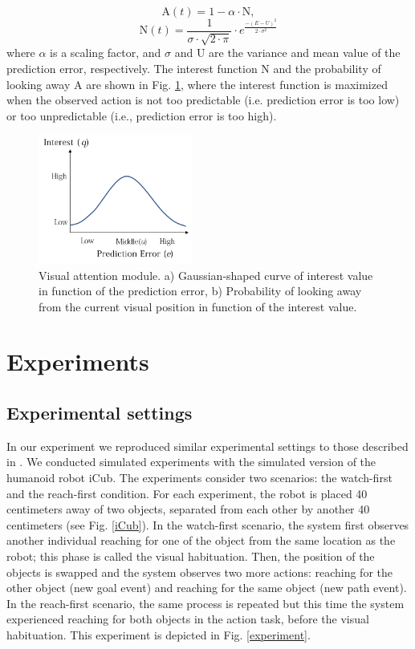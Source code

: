 \documentclass[conference]{IEEEtran}
\begin{document}
\begin{equation}
  \text{A}(t) = 1 - \alpha\cdot\text{N},
\end{equation}
\begin{equation}
  \text{N}(t) = \frac{1}{\sigma\cdot \sqrt{2\cdot\pi}}\cdot e^{\frac{-(E-U)^2}{2\cdot\sigma^2}}
  \label{gaussian}
\end{equation}
where \(\alpha\) is a scaling factor, and \(\sigma\) and \(\text{U}\) are the variance and mean value of the prediction error, respectively. The interest function \(\text{N}\) and the probability of looking away \(\text{A}\) are shown in Fig. \ref{Attention}, where the interest function is maximized when the observed action is not too predictable (i.e. prediction error is too low) or too unpredictable (i.e., prediction error is too high).

\begin{figure}[!t]
\centering
\includegraphics[width=0.45\textwidth,natwidth=700,natheight=450]{Figure5.png}
\caption{Visual attention module. a) Gaussian-shaped curve of interest value in function of the prediction error, b) Probability of looking away from the current visual position in function of the interest value.}
\label{Attention}
\end{figure}

\section{Experiments}

\subsection{Experimental settings}
In our experiment we reproduced similar experimental settings to those described in \cite{sommerville2005action}. We conducted simulated experiments with the simulated version of the humanoid robot iCub. The experiments consider two scenarios: the watch-first and the reach-first condition. For each experiment, the robot is placed 40 centimeters away of two objects, separated from each other by another 40 centimeters (see Fig. \ref{iCub}). In the watch-first scenario, the system first observes another individual reaching for one of the object from the same location as the robot; this phase is called the visual habituation. Then, the position of the objects is swapped and the system observes two more actions: reaching for the other object (new goal event) and reaching for the same object (new path event). In the reach-first scenario, the same process is repeated but this time the system experienced reaching for both objects in the action task, before the visual habituation. This experiment is depicted in Fig. \ref{experiment}.
\end{document}
